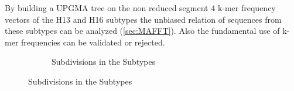 By building a \gls{UPGMA} tree on the non reduced segment 4 k-mer frequency vectors of the H13 and H16 subtypes the unbiased relation of sequences from these subtypes can be analyzed (\autoref{sec:MAFFT}). Also the fundamental use of k-mer frequencies can be validated or rejected. 
\begin{figure}[!hbt]
    \centering
    \begin{subfigure}[t]{0.475\textwidth}
        \caption{Subdivisions in the Subtypes}
        \label{subfig:root} 
        

\end{subfigure}
\end{figure}
